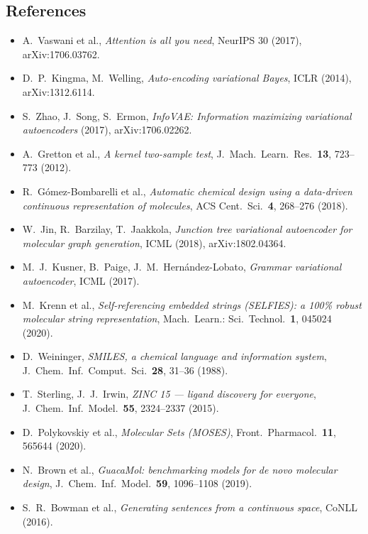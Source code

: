 \documentclass[11pt]{article}
\begin{document}
\subsection*{References}
{\small\sloppy
\begin{itemize}[nosep, leftmargin=1.2em]
  \item A.~Vaswani et al., \textit{Attention is all you need}, NeurIPS 30 (2017), arXiv:1706.03762.
  \item D.~P.~Kingma, M.~Welling, \textit{Auto-encoding variational Bayes}, ICLR (2014), arXiv:1312.6114.
  \item S.~Zhao, J.~Song, S.~Ermon, \textit{InfoVAE: Information maximizing variational autoencoders} (2017), arXiv:1706.02262.
  \item A.~Gretton et al., \textit{A kernel two-sample test}, J.\ Mach.\ Learn.\ Res.\ \textbf{13}, 723--773 (2012).
  \item R.~G\'omez-Bombarelli et al., \textit{Automatic chemical design using a data-driven continuous representation of molecules}, ACS Cent.\ Sci.\ \textbf{4}, 268--276 (2018).
  \item W.~Jin, R.~Barzilay, T.~Jaakkola, \textit{Junction tree variational autoencoder for molecular graph generation}, ICML (2018), arXiv:1802.04364.
  \item M.~J.~Kusner, B.~Paige, J.~M.~Hern\'andez-Lobato, \textit{Grammar variational autoencoder}, ICML (2017).
  \item M.~Krenn et al., \textit{Self-referencing embedded strings (SELFIES): a 100\% robust molecular string representation}, Mach.\ Learn.: Sci.\ Technol.\ \textbf{1}, 045024 (2020).
  \item D.~Weininger, \textit{SMILES, a chemical language and information system}, J.\ Chem.\ Inf.\ Comput.\ Sci.\ \textbf{28}, 31--36 (1988).
  \item T.~Sterling, J.~J.~Irwin, \textit{ZINC 15 --- ligand discovery for everyone}, J.\ Chem.\ Inf.\ Model.\ \textbf{55}, 2324--2337 (2015).
  \item D.~Polykovskiy et al., \textit{Molecular Sets (MOSES)}, Front.\ Pharmacol.\ \textbf{11}, 565644 (2020).
  \item N.~Brown et al., \textit{GuacaMol: benchmarking models for de novo molecular design}, J.\ Chem.\ Inf.\ Model.\ \textbf{59}, 1096--1108 (2019).
  \item S.~R.~Bowman et al., \textit{Generating sentences from a continuous space}, CoNLL (2016).
\end{itemize}}
\end{document}

